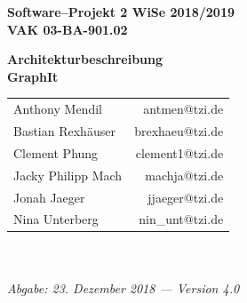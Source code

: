 \documentclass[enabledeprecatedfontcommands,fontsize=11pt,paper=a4,twoside]{scrartcl}
\begin{document}
	
	\thispagestyle{fancy}
	\fancyhead[LO,RE]{ }
	\fancyfoot[C]{}
	
	\vspace{3cm}
	
	\begin{minipage}[H]{\textwidth}
		\begin{center}
			\bf
			\Large
			Software--Projekt 2 WiSe 2018/2019\\
			\smallskip
			\small
			VAK 03-BA-901.02\\
			\vspace{3cm}
		\end{center}
	\end{minipage}
	\begin{minipage}[H]{\textwidth}
		\begin{center}
			\vspace{1cm}
			\bf
			\Large Architekturbeschreibung \\ 
			\vspace{1cm}
			\Huge\textbf{GraphIt}\normalsize
			\vfill
		\end{center}
	\end{minipage}
	\vfill
	\begin{minipage}[H]{\textwidth}
		\begin{center}
			\sf
			\begin{tabular}{lr}
				Anthony Mendil & antmen@tzi.de \\
				Bastian Rexhäuser & brexhaeu@tzi.de\\
				Clement Phung & clement1@tzi.de \\
				Jacky Philipp Mach & machja@tzi.de \\
				Jonah Jaeger & jjaeger@tzi.de \\
				Nina Unterberg & nin\_unt@tzi.de \\
			\end{tabular}
			\\ ~
			\vspace{2cm}
			\\
			\it Abgabe: 23. Dezember 2018 --- Version 4.0\\ ~
		\end{center}
	\end{minipage}
	
\end{document}
